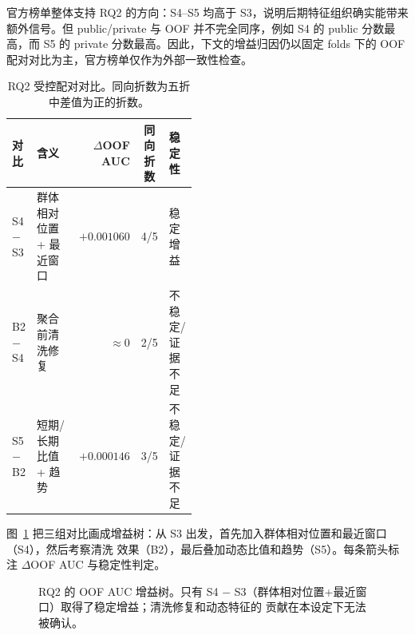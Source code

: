\documentclass[11pt,UTF8,fontset=windows]{ctexrep}
\begin{document}
官方榜单整体支持 RQ2 的方向：S4--S5 均高于 S3，说明后期特征组织确实能带来额外信号。但 public/private 与 OOF
并不完全同序，例如 S4 的 public 分数最高，而 S5 的 private 分数最高。因此，下文的增益归因仍以固定 folds 下的
OOF 配对对比为主，官方榜单仅作为外部一致性检查。

\begin{table}[h]
\centering
\caption{RQ2 受控配对对比。同向折数为五折中差值为正的折数。}
\label{tab:rq2-deltas}
\setlength{\tabcolsep}{4pt}
\begin{tabular}{l p{0.32\linewidth} r c p{0.14\linewidth}}
\toprule
对比 & 含义 & $\Delta$OOF AUC & 同向折数 & 稳定性 \\
\midrule
S4 $-$ S3 & 群体相对位置 + 最近窗口 & $+0.001060$ & 4/5 & 稳定增益 \\
B2 $-$ S4 & 聚合前清洗修复 & $\approx 0$    & 2/5 & 不稳定/证据不足 \\
S5 $-$ B2 & 短期/长期比值 + 趋势 & $+0.000146$  & 3/5 & 不稳定/证据不足 \\
\bottomrule
\end{tabular}
\end{table}

图~\ref{fig:rq2-gain-tree} 把三组对比画成增益树：从 S3 出发，首先加入群体相对位置和最近窗口（S4），然后考察清洗
效果（B2），最后叠加动态比值和趋势（S5）。每条箭头标注 $\Delta$OOF AUC 与稳定性判定。

\begin{figure}[h]
\centering
{}
\caption{RQ2 的 OOF AUC 增益树。只有 S4 $-$ S3（群体相对位置+最近窗口）取得了稳定增益；清洗修复和动态特征的
贡献在本设定下无法被确认。}
\label{fig:rq2-gain-tree}
\end{figure}
\end{document}
